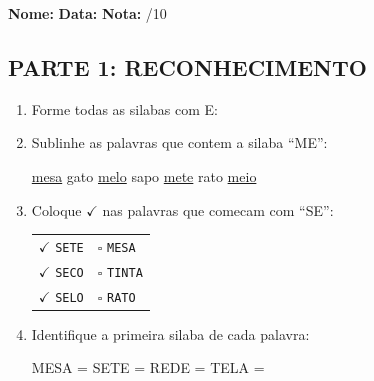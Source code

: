 \begin{exercicio}
\noindent\textbf{Nome:} \underline{\hspace{3.2cm}} \quad \textbf{Data:} \underline{\hspace{1.6cm}} \quad \textbf{Nota:} \underline{\hspace{0.9cm}}/10

\subsection*{PARTE 1: RECONHECIMENTO}

\begin{enumerate}
  \item Forme todas as silabas com E:
  \begin{center}
  \end{center}

  \item Sublinhe as palavras que contem a silaba ``ME'':
  \begin{center}
  \uline{mesa} \quad gato \quad \uline{melo} \quad sapo \quad \uline{mete} \quad rato \quad \uline{meio}
  \end{center}

  \item Coloque $\checkmark$ nas palavras que comecam com ``SE'':
  \begin{center}
  \begin{tabular}{ll}
  $\checkmark$ \texttt{SETE} & $\square$ \texttt{MESA} \\
  $\checkmark$ \texttt{SECO} & $\square$ \texttt{TINTA} \\
  $\checkmark$ \texttt{SELO} & $\square$ \texttt{RATO}
  \end{tabular}
  \end{center}

  \item Identifique a primeira silaba de cada palavra:
  \begin{center}
  MESA = \underline{\hspace{1cm}} \quad SETE = \underline{\hspace{1cm}} \quad REDE = \underline{\hspace{1cm}} \quad TELA = \underline{\hspace{1cm}}
  \end{center}


\end{enumerate}
\end{exercicio}
